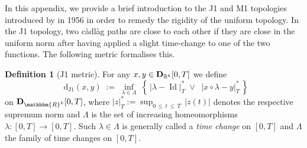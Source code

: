 \documentclass[11pt]{article}
\theoremstyle{definition}\newtheorem{example}[theorem]{Example}
\theoremstyle{definition}\newtheorem{counterexample}[theorem]{Counterexample}
\theoremstyle{definition}\newtheorem{remark}[theorem]{Remark}
\theoremstyle{definition}\newtheorem{defi}[theorem]{Definition}
\numberwithin{equation}{section}
\newcommand{\R}{\mathbb{R}}
\newcommand{\D}{{\bf D}}											%
\newcommand*\diff{\mathop{}\!\mathrm{d}}								%
\renewcommand{\|}{\; : \, \;}											%
\newcommand{\dJ}{\diff_{\operatorname{J1}}}								%
\begin{document}
In this appendix, we provide a brief introduction to the J1 and M1 topologies introduced by \cite{skorokhod} in 1956 in order to remedy the rigidity of the uniform topology. In the J1 topology, two càdlàg paths are close to each other if they are close in the uniform norm after having applied a slight time-change to one of the two functions. The following metric formalises this.
\begin{defi}[J1 metric]\label{def:J1_metric} For any $x,y \in \D_{\R^k}[0,T]$ we define
	$$\dJ(x,y) \; := \; \underset{\lambda \in \Lambda}{\operatorname{inf}} \; \left\{\,  |\lambda - \operatorname{Id} |_T^* \; \vee \; \; |x \circ \lambda - y|^*_T \,  \right\}$$
	on $\D_{\mathbbm{R}^k}[0,T]$, where $|z|_T^*:= \operatorname{sup}_{0\, \le \, t \, \le \, T} \, |z(t)|$ denotes the respective supremum norm and $\Lambda$ is the set of increasing homeomorphisms $\lambda: [0,T] \to [0,T]$. Such $\lambda \in \Lambda$ is generally called a \emph{time change} on $[0,T]$ and $\Lambda$ the family of time changes on $[0,T]$.
\end{defi}
\end{document}
